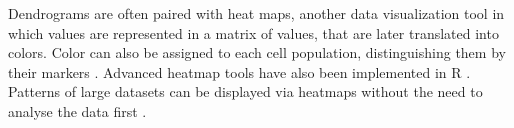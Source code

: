 Dendrograms are often paired with heat maps, another data visualization tool in which values are represented in a matrix of values, that are later translated into colors. Color can also be assigned to each cell population, distinguishing them by their markers \cite{ellyard2019non}. Advanced heatmap tools have also been implemented in R \citep{zhao2014advanced}. Patterns of large datasets can be displayed via heatmaps without the need to analyse the data first \citep{key2012tutorial}.













